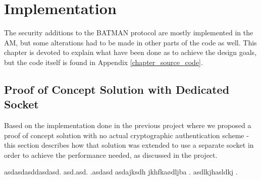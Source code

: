 \chapter{Implementation}

The security additions to the BATMAN protocol are mostly implemented in the
\ac{AM}, but some alterations had to be made in other parts of the code as well.
This chapter is devoted to explain what have been done as to achieve the design
goals, but the code itself is found in Appendix \ref{chapter_source_code}.

\section{Proof of Concept Solution with Dedicated Socket}
Based on the implementation done in the previous project where we proposed a
proof of concept solution with no actual cryptographic authentication scheme -
this section describes how that solution was extended to use a separate socket
in order to achieve the performance needed, as discussed in the project.

asdasdasddasdasd. asd.asd. .asdasd asdajksdh jkhfkaødljba . asdlkjhasldkj .